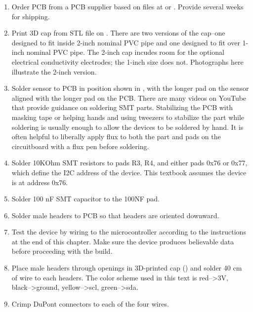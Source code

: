   \begin{enumerate}
  	\item Order PCB from a PCB supplier based on files at  or . Provide several weeks for shipping.
    \item Print 3D cap from STL file on . There are two versions of the cap--one designed to fit inside 2-inch nominal PVC pipe and one designed to fit over 1-inch nominal PVC pipe. The 2-inch cap incudes room for the optional electrical conductivity electrodes; the 1-inch size does not. Photographs here illustrate the 2-inch version.
    \item Solder sensor to PCB in position shown in , with the longer pad on the sensor aligned with the longer pad on the PCB. There are many videos on YouTube that provide guidance on soldering SMT parts. Stabilizing the PCB with masking tape or helping hands and using tweezers to stabilize the part while soldering is usually enough to allow the devices to be soldered by hand. It is often helpful to liberally apply flux to both the part and pads on the circuitboard with a flux pen before soldering.
    \item Solder 10KOhm SMT resistors to pads R3, R4, and either pads 0x76 or 0x77, which define the I2C address of the device. This textbook assumes the device is at address 0x76.
    \item Solder 100 nF SMT capacitor to the 100NF pad.
  	\item Solder male headers to PCB so that headers are oriented downward.
    \item Test the device by wiring to the microcontroller according to the instructions at the end of this chapter.  Make sure the device produces believable data before proceeding with the build.
  	\item Place male headers through openings in 3D-printed cap () and solder 40 cm of wire to each headers. The color scheme used in this text is red-->3V, black-->ground, yellow-->scl, green-->sda.
  	\item Crimp DuPont connectors to each of the four wires.


\end{enumerate}
